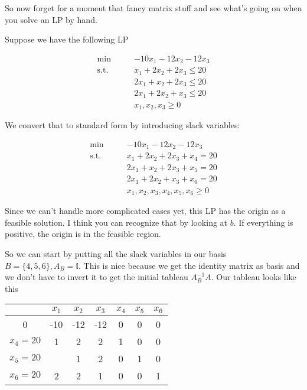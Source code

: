 \begin{Ex} So now forget for a moment that fancy matrix stuff and see what's going on when you solve an LP by hand.

Suppose we have the following LP

\begin{align*}
\min \qquad& -10 x_1 - 12 x_2 - 12 x_3\\
\text{s.t.}\qquad & x_1 + 2 x_2 +2 x_3 \leq 20\\
& 2x_1 + x_2 + 2 x_3\leq 20\\
& 2x_1 + 2 x_2 + x_3\leq 20\\
& x_1,x_2,x_3 \geq 0
\end{align*}

We convert that to standard form by introducing slack variables:

\begin{align*}
\min \qquad 	  & -10 x_1 -12 x_2 -12 x_3 \\
\text{s.t.}\qquad & x_1 + 2 x_2 + 2 x_3 + x_4 = 20\\
		  & 2x_1 + x_2 + 2 x_3 + x_5  = 20\\
		  & 2 x_1 + 2 x_2 + x_3 + x_6 = 20\\
		  & x_1,x_2,x_3,x_4,x_5,x_6   \geq 0
\end{align*}

Since we can't handle more complicated cases yet, this LP has the origin as a feasible solution. I think you can recognize that by looking at $b$. If everything is positive, the origin is in the feasible region.

So we can start by putting all the slack variables in our basis $B=\{4,5,6\}, A_B=\mathbb{I}$. This is nice because we get the identity matrix as basis and we don't have to invert it to get the initial tableau $A_B^{-1}A$. Our tableau looks like this

\begin{center}
\begin{tabular}{c|cccccc}\label{tab:pivotExample}
  & $x_1$ & $x_2$ & $x_3$ & $x_4$ & $x_5$ & $x_6$ \\\hline
0 & -10 & -12 & -12 & 0 & 0 & 0\\\hline
$x_4=20$ & 1 & 2 & 2 & 1 &  0 & 0 \\
$x_5=20$ & \cellcolor{gruen}{\bf 2} & 1 & 2 & 0 &  1 & 0\\
$x_6=20$ & 2 & 2 & 1 & 0 &  0 & 1\\
\end{tabular}
\end{center}


\end{Ex}
